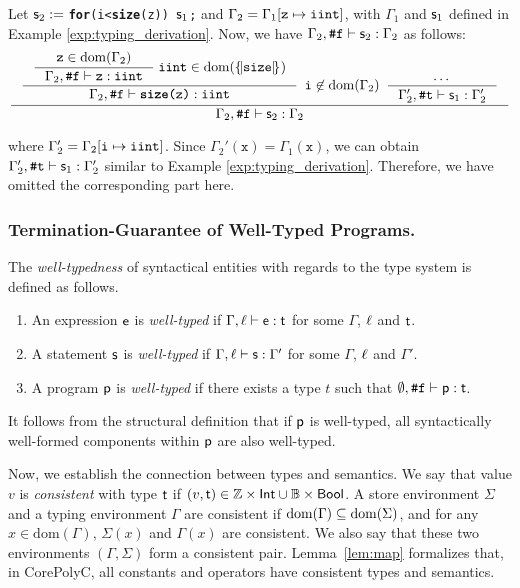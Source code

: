 \documentclass[runningheads]{llncs}
\begin{document}
\begin{example}[Loop]
\label{exp:loop}
Let $\s_2:=\;$\texttt{\textbf{for}(i<\textbf{size}(z)) $\s_1$;} and $\Gamma_2 = \Gamma_1[\texttt{z}\mapsto\typeIterInt]$, with $\Gamma_1$ and $\s_1$ defined in Example \ref{exp:typing_derivation}.
Now, we have $\typing{\Gamma_2}{\f}{\s_2}{\Gamma_2}$ as follows:
{
\small
$$
\inference
{
    {
    \inference
    {
        {
        \inference
        {\texttt{z}\in\dom(\Gamma_2)}
        {\typing{\Gamma_2}{\f}{\texttt{z}}{\typeIterInt}}
        }\;
        \typeIterInt\in\dom(\tmap{\opSize}{})
    }
    {
        \typing{\Gamma_2}{\f}{\texttt{\textbf{size}(z)}}{\typeIterInt}
    }
    }
    \enspace
    \texttt{i}\not\in\dom(\Gamma_2)
    \enspace
    {
    \inference
    {
        \text{$\cdots$}
    }
    {
        \typing{\Gamma_2'}{\t}{\s_1}{\Gamma_2'}
    }
    }
}
{\typing{\Gamma_2}{\f}{\s_2}{\Gamma_2}}
$$
}

\noindent
where $\Gamma_2'=\Gamma_2[\texttt{i}\mapsto\typeIterInt]$.
Since $\Gamma_2'(\texttt{x}) = \Gamma_1(\texttt{x})$, we can obtain $\typing{\Gamma_2'}{\t}{\s_1}{\Gamma_2'}$ similar to Example \ref{exp:typing_derivation}.
Therefore, we have omitted the corresponding part here.
\end{example}

\subsubsection{Termination-Guarantee of Well-Typed Programs.}
The \emph{well-typedness} of syntactical entities with regards to the type system is defined as follows.
\begin{enumerate}
    \item An expression $\e$ is \emph{well-typed} if $\typing{\Gamma}{\l}{\e}{\tt}$ for some $\Gamma$, $\l$ and $\tt$.
    \item A statement $\s$ is \emph{well-typed} if $\typing{\Gamma}{\l}{\s}{\Gamma'}$ for some $\Gamma$, $\l$ and $\Gamma'$.
    \item A program $\p$ is \emph{well-typed} if there exists a type $t$ such that $\typing{\emptyset}{\f}{\p}{\tt}$.
\end{enumerate}
It follows from the structural definition that if $\p$ is well-typed, all syntactically well-formed components within $\p$ are also well-typed.

Now, we establish the connection between types and semantics.
We say that value $v$ is \textit{consistent} with type $\tt$ if $(v,\tt)\in\Z\times\Int\cup\B\times\Bool$.
A store environment $\Sigma$ and a typing environment $\Gamma$ are consistent if $\dom(\Gamma)\subseteq\dom(\Sigma)$, and for any $x\in\text{dom}(\Gamma)$, $\Sigma(x)$ and $\Gamma(x)$ are consistent.
We also say that these two environments $(\Gamma, \Sigma)$ form a consistent pair.
Lemma~\ref{lem:map} formalizes that, in CorePolyC, all constants and operators have consistent types and semantics.
\end{document}
